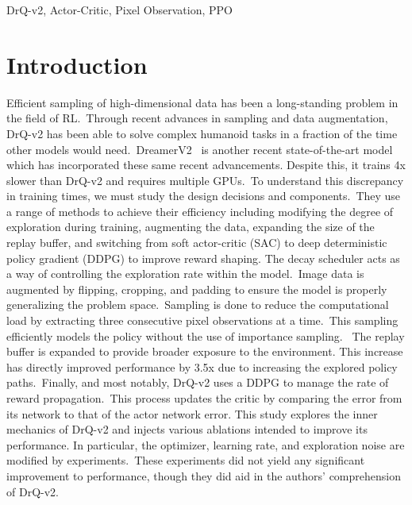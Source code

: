 \documentclass[conference]{./IEEEtran/IEEEtran} %
\begin{document}
    \begin{IEEEkeywords}
        DrQ-v2, Actor-Critic, Pixel Observation, PPO
    \end{IEEEkeywords}

    \section{Introduction}\label{sec:introduction}



    Efficient sampling of high-dimensional data has been a long-standing problem in the field of RL.\ Through recent advances in
    sampling and data augmentation, DrQ-v2 has been able to solve complex humanoid tasks in a fraction of the time other models
    would need.\ DreamerV2~\cite{DreamerV2} is another recent state-of-the-art model which has incorporated these same recent advancements.
    Despite this, it trains 4x slower than DrQ-v2 and requires multiple GPUs.\ To understand this discrepancy in training
    times, we must study the design decisions and components.\ They use a range of methods to achieve their efficiency including
    modifying the degree of exploration during training, augmenting the data, expanding the size of the replay buffer,
    and switching from soft actor-critic (SAC) to deep deterministic policy gradient (DDPG) to improve reward shaping.
    The decay scheduler acts as a way of controlling the exploration rate within the model.\ Image data is augmented by
    flipping, cropping, and padding to ensure the model is properly generalizing the problem space.\ Sampling is done
    to reduce the computational load by extracting three consecutive pixel observations at a time.\ This sampling efficiently
    models the policy without the use of importance sampling. \ The replay buffer is expanded to provide broader exposure to the environment.
    This increase has directly improved performance by 3.5x due to increasing the explored policy paths.\ Finally, and most
    notably, DrQ-v2 uses a DDPG to manage the rate of reward propagation.\ This process updates the critic by comparing the error
    from its network to that of the actor network error.
    This study explores the inner mechanics of DrQ-v2 and injects various ablations intended to improve its performance.
    In particular, the optimizer, learning rate, and exploration noise are modified by experiments.\ These experiments
    did not yield any significant improvement to performance, though they did aid in the authors' comprehension of DrQ-v2.
\end{document}
